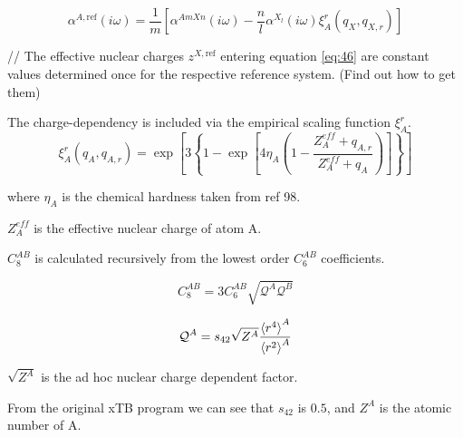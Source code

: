 \begin{equation} \label{eq:46}
  \alpha^{A,\text{ref}}(i\omega) = \frac{1}{m} \left[\alpha^{AmXn}(i\omega) - \frac{n}{l} \alpha^{X_l}(i\omega) \xi_A^r(q_X, q_{X,r})\right]
\end{equation}

// The effective nuclear charges \(z^{X,\text{ref}}\) entering equation \ref{eq:46} are constant values determined once for the respective reference system. (Find out how to get them)



\vspace{10pt}
\noindent
The charge-dependency is included via the empirical scaling function \(\xi_A^r\).
\begin{equation}
  \xi_A^r(q_A, q_{A,r}) = \exp\left[3\left\{1-\exp\left[4\eta_A\left(1-\frac{Z_A^{eff} + q_{A,r}}{Z_A^{eff} + q_A}\right)\right]\right\}\right]
\end{equation}

\noindent
where \(\eta_A\) is the chemical hardness taken from ref 98.

\noindent
\(Z_A^{eff}\) is the effective nuclear charge of atom A.



\vspace{10pt}
\noindent
\(C_8^{AB}\) is calculated recursively from the lowest order \(C_6^{AB}\) coefficients.

\begin{equation}
  C_8^{AB} = 3C_6^{AB} \sqrt{\mathcal{Q}^A\mathcal{Q}^B}
\end{equation}

\begin{equation}
  \mathcal{Q}^A = s_{42} \sqrt{Z^A} \frac{\braket{r^4}^A}{\braket{r^2}^A}
\end{equation}


\vspace{10pt}
\noindent
\(\sqrt{Z^A}\) is the ad hoc nuclear charge dependent factor.

From the original xTB program we can see that \(s_{42}\) is \(0.5\), and \(Z^A\) is the atomic number of A.

